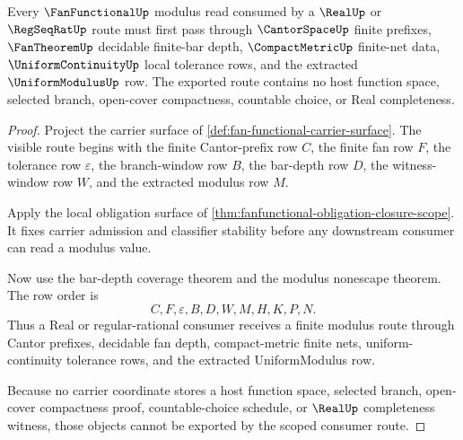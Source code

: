 \begin{theorem}
\label{thm:fanfunctional-real-regseqrat-scope}
Every $\FanFunctionalUp$ modulus read consumed by a $\RealUp$ or $\RegSeqRatUp$ route must first pass through $\CantorSpaceUp$ finite prefixes, $\FanTheoremUp$ decidable finite-bar depth, $\CompactMetricUp$ finite-net data, $\UniformContinuityUp$ local tolerance rows, and the extracted $\UniformModulusUp$ row. The exported route contains no host function space, selected branch, open-cover compactness, countable choice, or Real completeness.
\end{theorem}
\begin{proof}
Project the carrier surface of \autoref{def:fan-functional-carrier-surface}. The visible route begins with the finite Cantor-prefix row $C$, the finite fan row $F$, the tolerance row $\varepsilon$, the branch-window row $B$, the bar-depth row $D$, the witness-window row $W$, and the extracted modulus row $M$.

Apply the local obligation surface of \autoref{thm:fanfunctional-obligation-closure-scope}. It fixes carrier admission and classifier stability before any downstream consumer can read a modulus value.

Now use the bar-depth coverage theorem and the modulus nonescape theorem. The row order is
$$
C,F,\varepsilon,B,D,W,M,H,K,P,N .
$$
Thus a Real or regular-rational consumer receives a finite modulus route through Cantor prefixes, decidable fan depth, compact-metric finite nets, uniform-continuity tolerance rows, and the extracted UniformModulus row.

Because no carrier coordinate stores a host function space, selected branch, open-cover compactness proof, countable-choice schedule, or $\RealUp$ completeness witness, those objects cannot be exported by the scoped consumer route.
\end{proof}
